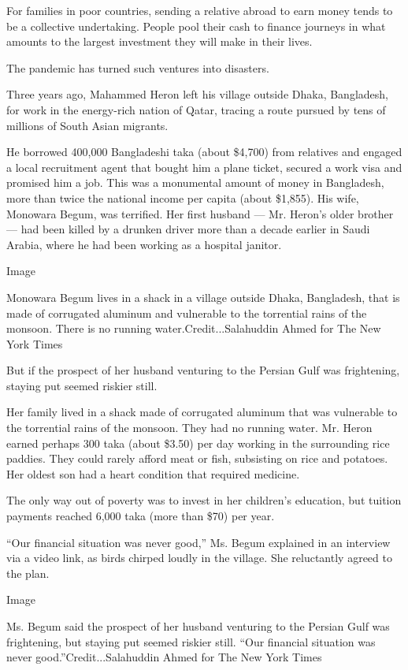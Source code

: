 For families in poor countries, sending a relative abroad to earn money
tends to be a collective undertaking. People pool their cash to finance
journeys in what amounts to the largest investment they will make in
their lives.

The pandemic has turned such ventures into disasters.

Three years ago, Mahammed Heron left his village outside Dhaka,
Bangladesh, for work in the energy-rich nation of Qatar, tracing a route
pursued by tens of millions of South Asian migrants.

He borrowed 400,000 Bangladeshi taka (about \$4,700) from relatives and
engaged a local recruitment agent that bought him a plane ticket,
secured a work visa and promised him a job. This was a monumental amount
of money in Bangladesh, more than twice the national income per capita
(about \$1,855). His wife, Monowara Begum, was terrified. Her first
husband --- Mr. Heron's older brother --- had been killed by a drunken
driver more than a decade earlier in Saudi Arabia, where he had been
working as a hospital janitor.

Image

Monowara Begum lives in a shack in a village outside Dhaka, Bangladesh,
that is made of corrugated aluminum and vulnerable to the torrential
rains of the monsoon. There is no running water.Credit...Salahuddin
Ahmed for The New York Times

But if the prospect of her husband venturing to the Persian Gulf was
frightening, staying put seemed riskier still.

Her family lived in a shack made of corrugated aluminum that was
vulnerable to the torrential rains of the monsoon. They had no running
water. Mr. Heron earned perhaps 300 taka (about \$3.50) per day working
in the surrounding rice paddies. They could rarely afford meat or fish,
subsisting on rice and potatoes. Her oldest son had a heart condition
that required medicine.

The only way out of poverty was to invest in her children's education,
but tuition payments reached 6,000 taka (more than \$70) per year.

``Our financial situation was never good,'' Ms. Begum explained in an
interview via a video link, as birds chirped loudly in the village. She
reluctantly agreed to the plan.

Image

Ms. Begum said the prospect of her husband venturing to the Persian Gulf
was frightening, but staying put seemed riskier still. ``Our financial
situation was never good.''Credit...Salahuddin Ahmed for The New York
Times

